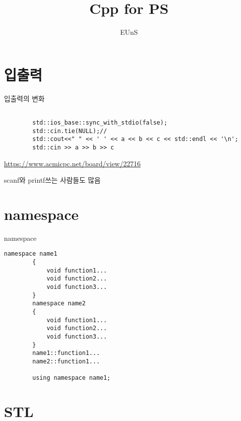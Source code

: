 \documentclass[10pt]{beamer}
\title{Cpp for PS}
\author{EUnS}
\begin{document}
\begin{frame}
  \maketitle
\end{frame}


\begin{frame}
	\tableofcontents
\end{frame}
\section{입출력}
\begin{frame}[fragile]{입출력의 변화}
    \begin{lstlisting}[style = CppStyle]
    
        std::ios_base::sync_with_stdio(false); 
        std::cin.tie(NULL);//
        std::cout<<" " << ' ' << a << b << c << std::endl << '\n';
        std::cin >> a >> b >> c 
    \end{lstlisting}
    \url{https://www.acmicpc.net/board/view/22716}

    scanf와 printf쓰는 사람들도 많음
\end{frame}

\section{namespace}


\begin{frame}[fragile]{namespace}
    \begin{lstlisting}[style = CppStyle]
        namespace name1
        {
            void function1...
            void function2...
            void function3...
        }
        namespace name2
        {
            void function1...
            void function2...
            void function3...
        }
        name1::function1...
        name2::function1...

        using namespace name1;
    \end{lstlisting}
\end{frame}



\section{STL}
\end{document}
